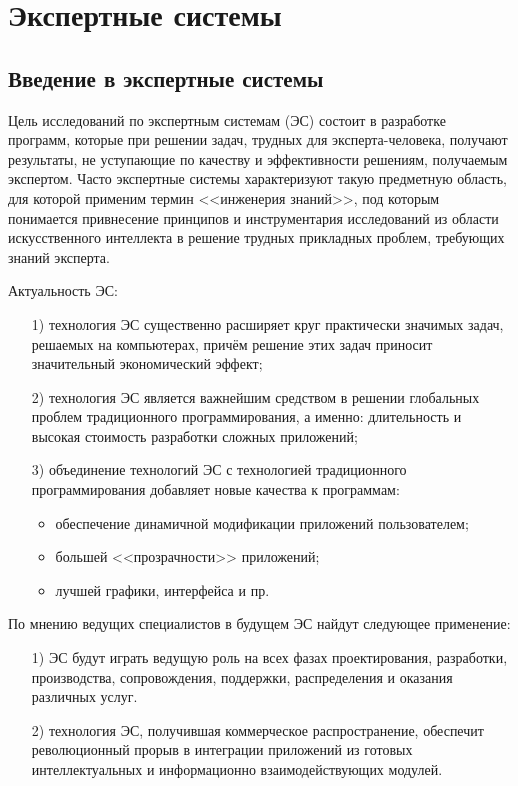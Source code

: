 \chapter{Экспертные системы}

\section{Введение в экспертные системы}

Цель исследований по экспертным системам (ЭС) состоит в разработке
программ, которые при решении задач, трудных для эксперта-человека,
получают результаты, не уступающие по качеству и эффективности
решениям, получаемым экспертом. Часто экспертные системы характеризуют
такую предметную область, для которой применим термин <<инженерия
знаний>>, под которым понимается привнесение принципов и
инструментария исследований из области искусственного интеллекта в
решение трудных прикладных проблем, требующих знаний эксперта.

Актуальность ЭС:
\begin{enumerate}
\item[1)] технология ЭС существенно расширяет круг практически значимых
  задач, решаемых на компьютерах, причём решение этих задач приносит
  значительный экономический эффект;
\item[2)] технология ЭС является важнейшим средством в решении глобальных
  проблем традиционного программирования, а именно: длительность и
  высокая стоимость разработки сложных приложений;
\item[3)] объединение технологий ЭС с технологией традиционного
  программирования добавляет новые качества к программам:
  \begin{itemize}
  \item обеспечение динамичной модификации приложений пользователем;
  \item большей <<прозрачности>> приложений;
  \item лучшей графики, интерфейса и пр.
  \end{itemize}
\end{enumerate}

По мнению ведущих специалистов в будущем ЭС найдут следующее
применение:
\begin{enumerate}
\item[1)] ЭС будут играть ведущую роль на всех фазах проектирования,
  разработки, производства, сопровождения, поддержки, распределения и
  оказания различных услуг.
\item[2)] технология ЭС, получившая коммерческое распространение,
  обеспечит революционный прорыв в интеграции приложений из готовых
  интеллектуальных и информационно взаимодействующих модулей.
\end{enumerate}

